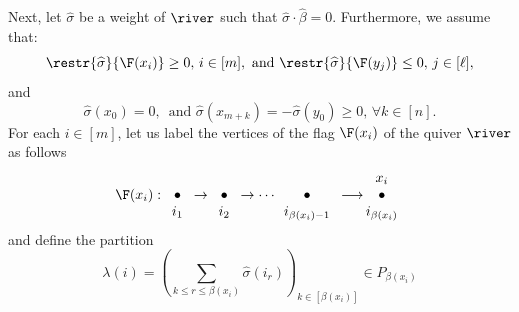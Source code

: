 Next, let $\widehat{\sigma}$ be a weight of $\river$ such that $\widehat{\sigma} \cdot \widehat{\beta}=0$. Furthermore, we assume that:
\begin{equation}\label{eqn1-sigma-hat}
\restr{\widehat{\sigma}}{\F(x_i)} \geq 0, \, i \in [m], \text{~and~} \restr{\widehat{\sigma}}{\F(y_j)} \leq 0, \, j \in [\ell],
\end{equation}
and
\begin{equation}\label{eqn2-sigma-hat}
\widehat{\sigma}(x_0)=0, \, \text{~and~} \widehat{\sigma}(x_{m+k})=-\widehat{\sigma}(y_0) \geq 0, \, \forall k \in [n].
\end{equation}
For each $i \in [m]$, let us label the vertices of the flag $\F(x_i)$  of the quiver $\river$ as follows
$$ 
\F(x_i) : \begin{array}{c}\\{\bullet} \\ i_1 \end{array}  \rightarrow \begin{array}{c}\\{\bullet} \\ i_2 \end{array} \rightarrow \cdots \begin{array}{c}\\{\bullet} \\ i_{\beta(x_i)-1} \end{array} \longrightarrow \hspace{-6pt} \begin{array}{c} x_i\\ \bullet \\i_{\beta(x_i)} \end{array}
$$
and define the partition 
\begin{equation}\label{defn-lambda-sigma-hat-eqn1}
\lambda(i)=\left( \sum_{k \leq r \leq \beta(x_i)} \widehat{\sigma}(i_r) \right)_{k \in [\beta(x_i)]} \in P_{\beta(x_i)}
\end{equation}

